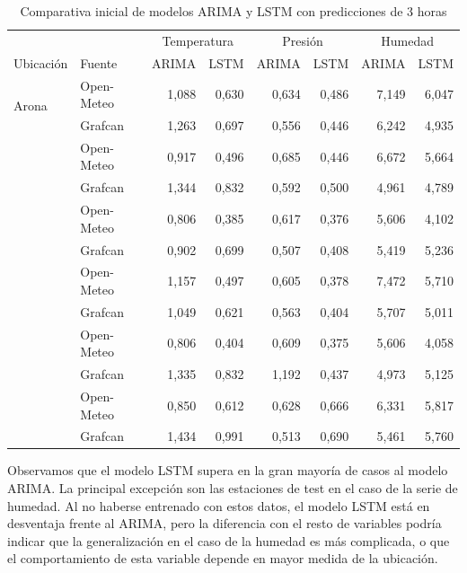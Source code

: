 \begin{table}[ht]
\centering
\begin{tabular}{llrrrrrr}
\toprule
 &  & \multicolumn{2}{c}{Temperatura} & \multicolumn{2}{c}{Presión} & \multicolumn{2}{c}{Humedad} \\
\cmidrule(lr){3-4} \cmidrule(lr){5-6} \cmidrule(lr){7-8}
Ubicación & Fuente & ARIMA & LSTM & ARIMA & LSTM & ARIMA & LSTM \\
\midrule
\multirow{2}{*}{Arona}
  & Open-Meteo    & 1,088 & 0,630 & 0,634 & 0,486 & 7,149 & 6,047 \\
  & Grafcan       & 1,263 & 0,697 & 0,556 & 0,446 & 6,242 & 4,935 \\
\addlinespace
\multirow{2}{*}{La Orotava}
  & Open-Meteo    & 0,917 & 0,496 & 0,685 & 0,446 & 6,672 & 5,664 \\
  & Grafcan       & 1,344 & 0,832 & 0,592 & 0,500 & 4,961 & 4,789 \\
\addlinespace
\multirow{2}{*}{La Laguna 1}
  & Open-Meteo    & 0,806 & 0,385 & 0,617 & 0,376 & 5,606 & 4,102 \\
  & Grafcan       & 0,902 & 0,699 & 0,507 & 0,408 & 5,419 & 5,236 \\
\addlinespace
\multirow{2}{*}{La Laguna 2}
  & Open-Meteo    & 1,157 & 0,497 & 0,605 & 0,378 & 7,472 & 5,710 \\
  & Grafcan       & 1,049 & 0,621 & 0,563 & 0,404 & 5,707 & 5,011 \\
\addlinespace
\multirow{2}{*}{Santa Cruz}
  & Open-Meteo    & 0,806 & 0,404 & 0,609 & 0,375 & 5,606 & 4,058 \\
  & Grafcan       & 1,335 & 0,832 & 1,192 & 0,437 & 4,973 & 5,125 \\
\addlinespace
\multirow{2}{*}{Garachico}
  & Open-Meteo    & 0,850 & 0,612 & 0,628 & 0,666 & 6,331 & 5,817 \\
  & Grafcan       & 1,434 & 0,991 & 0,513 & 0,690 & 5,461 & 5,760 \\
\bottomrule
\end{tabular}
\caption{Comparativa inicial de modelos ARIMA y LSTM con predicciones de 3 horas} 
\label{comparativa_inicial}
\end{table}

Observamos que el modelo LSTM supera en la gran mayoría de casos al modelo ARIMA. La principal excepción son las estaciones de test en el caso de la serie de humedad.
Al no haberse entrenado con estos datos, el modelo LSTM está en desventaja frente al ARIMA, pero la diferencia con el resto de variables podría indicar que la generalización en el caso de la humedad 
es más complicada, o que el comportamiento de esta variable depende en mayor medida de la ubicación. 

